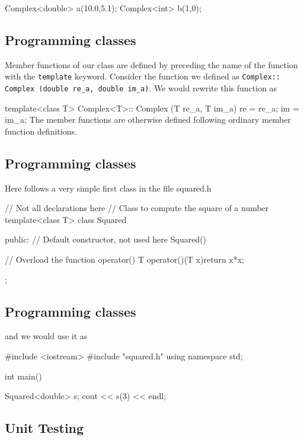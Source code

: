 \documentclass[%
oneside,                 %
final,                   %
10pt]{article}
\begin{document}
{{{{{{{{{{{{{{{\bcppcod
Complex<double> a(10.0,5.1);
Complex<int> b(1,0);
\ecppcod

\subsection{Programming classes}

Member functions of our class are defined by preceding the name of the function with the \Verb!template! keyword.
Consider the function we defined as \Verb!Complex:: Complex (double re_a, double im_a)!.
We would rewrite this function as

\bcppcod
template<class T>
Complex<T>:: Complex (T re_a, T im_a)
{ re = re_a; im = im_a; }
\ecppcod
The member functions  are otherwise defined following ordinary member function definitions.

\subsection{Programming classes}

Here follows a very simple first class in the file squared.h

\bcppcod
// Not all declarations here
// Class to compute the square of a number
template<class T>
class Squared{
  public:
    // Default constructor, not used here
    Squared(){}

    // Overload the function operator()
    T operator()(T x){return x*x;}

};
\ecppcod

\subsection{Programming classes}

and we would use it as

\bcppcod
#include <iostream>
#include "squared.h"
using namespace std;

int main(){
  Squared<double> s;
  cout << s(3) << endl;

\ecppcod


\subsection{Unit Testing}

}}}}}}}}}}}}}}}}
\end{document}
